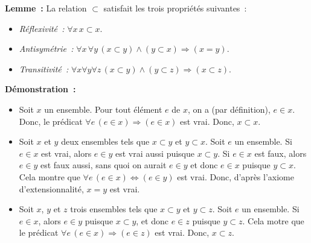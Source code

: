 \done

\medskip

\noindent \textbf{Lemme :} La relation $\subset$ satisfait les trois propriétés suivantes : 
\begin{itemize}[nosep]
    \item \textit{Réflexivité :} $\forall x \, x \subset x$.
    \item \textit{Antisymétrie :} $\forall x \, \forall y \, (x \subset y) \wedge (y \subset x) \Rightarrow (x = y)$.
    \item \textit{Transitivité :} $\forall x \forall y \forall z \, (x \subset y) \wedge (y \subset z) \Rightarrow (x \subset z)$.
\end{itemize}

\medskip

\noindent \textbf{Démonstration :} 
\begin{itemize}[nosep]
    \item Soit $x$ un ensemble. Pour tout élément $e$ de $x$, on a (par définition), $e \in x$. 
        Donc, le prédicat $\forall e \, (e \in x) \Rightarrow (e \in x)$ est vrai.
        Donc, $x \subset x$.
    \item Soit $x$ et $y$ deux ensembles tels que $x \subset y$ et $y \subset x$.
        Soit $e$ un ensemble. 
        Si $e \in x$ est vrai, alors $e \in y$ est vrai aussi puisque $x \subset y$.
        Si $e \in x$ est faux, alors $e \in y$ est faux aussi, sans quoi on aurait $e \in y$ et donc $e \in x$ puisque $y \subset x$.
        Cela montre que $\forall e \, (e \in x) \Leftrightarrow (e \in y)$ est vrai. 
        Donc, d'après l'axiome d'extensionnalité, $x = y$ est vrai.
    \item Soit $x$, $y$ et $z$ trois ensembles tels que $x \subset y$ et $y \subset z$. 
        Soit $e$ un ensemble. 
        Si $e \in x$, alors $e \in y$ puisque $x \subset y$, et donc $e \in z$ puisque $y \subset z$. 
        Cela motre que le prédicat $\forall e \, (e \in x) \Rightarrow (e \in z)$ est vrai.
        Donc, $x \subset z$.
\end{itemize}

\done

\medskip

